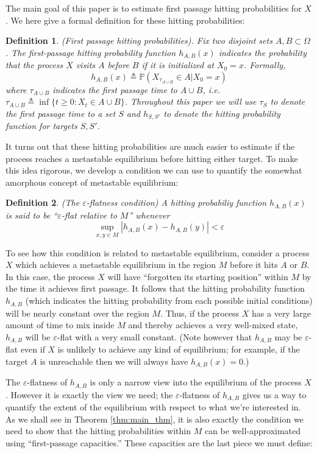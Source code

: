 \documentclass[12pt, nofootinbib,english, amsmath, amssymb, aps, priprint, graphicx,floatfix]{revtex4-1}
\newtheorem{definition}{Definition}
\theoremstyle{plain}
\theoremstyle{definition}
\theoremstyle{plain}
\begin{document}
The main goal of this paper is to estimate first passage hitting probabilities for $X$.  We here give a formal definition for these hitting probabilities: 

\begin{definition}(First passage hitting probabilities).  Fix two disjoint sets $A,B\subset \Omega$.  The first-passage hitting probability function $h_{A,B}(x)$ indicates the probability that the process $X$ visits $A$ before $B$ if it is initialized at $X_0=x$.  Formally,
\[ h_{A, B}(x) \triangleq \mathbb{P}(X_{\tau_{A\cup B}}\in A|X_0=x)\]
where $\tau_{A\cup B}$ indicates the first passage time to $A\cup B$, i.e.\ $\tau_{A\cup B} \triangleq \inf \{ t \geqslant 0 : X_t \in A \cup B \}$.  Throughout this paper we will use $\tau_S$ to denote the first passage time to a set $S$ and $h_{S,S'}$ to denote the hitting probability function for targets $S,S'$. 
\end{definition}

It turns out that these hitting probabilities are much easier to estimate if the process reaches a metastable equilibrium before hitting either target.  To make this idea rigorous, we develop a condition we can use to quantify the somewhat amorphous concept of metastable equilibrium:  
\begin{definition}(The $\varepsilon$-flatness condition)  A hitting probabiliy function $h_{A,B}(x)$ is said to be  
``$\varepsilon$-flat relative to $M$'' whenever
\[
\sup_{x, y \in M} |h_{A,B}(x) - h_{A,B}(y)| < \varepsilon
\]
\end{definition}
To see how this condition is related to metastable equilibrium, consider a process $X$ which achieves a metastable equilibrium in the region $M$ before it hits $A$ or $B$.  In this case, the process $X$ will have ``forgotten its starting position'' within $M$ by the time it achieves first passage.  It follows that the hitting probability function $h_{A,B}$ (which indicates the hitting probability from each possible initial conditions) will be nearly constant over the region $M$.  Thus, if the process $X$ has a very large amount of time to mix inside $M$ and thereby achieves a very well-mixed state, $h_{A,B}$ will be $\varepsilon$-flat with a very small constant.  (Note however that $h_{A,B}$ may be $\varepsilon$-flat even if $X$ is unlikely to achieve any kind of equilibrium; for example, if the target $A$ is unreachable then we will always have $h_{A,B}(x)=0$.)   

The $\varepsilon$-flatness of $h_{A,B}$ is only a narrow view into the equilibrium of the process $X$.  However it is exactly the view we need; the $\varepsilon$-flatness of $h_{A,B}$ gives us a way to quantify the extent of the equilibrium with respect to what we're interested in.  As we shall see in Theorem \ref{thm:main_thm}, it is also exactly the condition we need to show that the hitting probabilities within $M$ can be well-approximated using ``first-passage capacities.''  These capacities are the last piece we must define:
\end{document}
